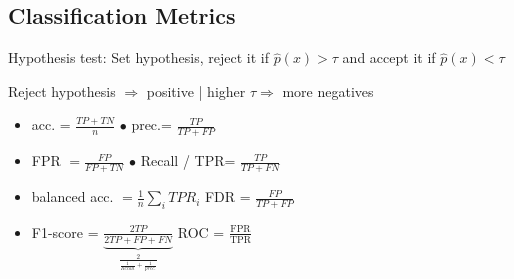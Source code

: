 \subsection{Classification Metrics}

Hypothesis test: Set hypothesis, reject it if $\hat{p}(x) > \tau$ and accept it if $\hat{p}(x) < \tau$

Reject hypothesis $\Rightarrow$ positive | higher $\tau \Rightarrow$ more negatives 



\begin{itemize}
    \item \color{Green}acc.\color{black} = $\frac{TP + TN}{n}$ \hspace{0.1cm} $\bullet$ \color{Green}prec.\color{black}= $ \frac{TP}{TP+FP}$
    \item \color{Red}FPR\color{black} $= \frac{FP}{FP+TN}$ \hspace{0.1cm} $\bullet$ \color{Green}Recall / TPR\color{black}= $\frac{TP}{TP+FN}$
    \item \color{Green}balanced acc.\color{black} $= \frac{1}{n}\sum_iTPR_i$ \hspace{0.1cm} \color{Red}FDR\color{black} = $\frac{FP}{TP + FP}$
    \item \color{Green}F1-score\color{black} = $\underbrace{\frac{2TP}{2TP +FP + FN}}_{\frac{2}{\frac{1}{Recall} + \frac{1}{prec.}}}$ \hspace{0.1cm} \color{Green}ROC\color{black} = $\frac{\text{FPR}}{\text{TPR}}$
\end{itemize}



